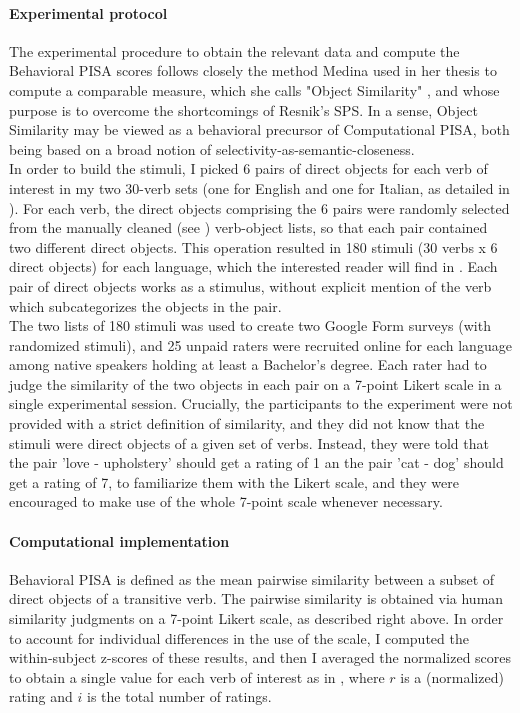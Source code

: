 \paragraph{Experimental protocol}
The experimental procedure to obtain the relevant data and compute the Behavioral PISA scores follows closely the method Medina used in her thesis to compute a comparable measure, which she calls "Object Similarity" \parencite[173-178]{Medina2007}, and whose purpose is to overcome the shortcomings of Resnik's SPS. In a sense, Object Similarity may be viewed as a behavioral precursor of Computational PISA, both being based on a broad notion of selectivity-as-semantic-closeness.\\
In order to build the stimuli, I picked 6 pairs of direct objects for each verb of interest in my two 30-verb sets (one for English and one for Italian, as detailed in ). For each verb, the direct objects comprising the 6 pairs were randomly selected from the manually cleaned (see ) verb-object lists, so that each pair contained two different direct objects. This operation resulted in 180 stimuli (30 verbs x 6 direct objects) for each language, which the interested reader will find in . Each pair of direct objects works as a stimulus, without explicit mention of the verb which subcategorizes the objects in the pair.\\
The two lists of 180 stimuli was used to create two Google Form surveys (with randomized stimuli), and 25 unpaid raters were recruited online for each language among native speakers holding at least a Bachelor's degree. Each rater had to judge the similarity of the two objects in each pair on a 7-point Likert scale in a single experimental session. Crucially, the participants to the experiment were not provided with a strict definition of similarity, and they did not know that the stimuli were direct objects of a given set of verbs. Instead, they were told that the pair 'love - upholstery' should get a rating of 1 an the pair 'cat - dog' should get a rating of 7, to familiarize them with the Likert scale, and they were encouraged to make use of the whole 7-point scale whenever necessary.

\paragraph{Computational implementation} Behavioral PISA is defined as the mean pairwise similarity between a subset of direct objects of a transitive verb. The pairwise similarity is obtained via human similarity judgments on a 7-point Likert scale, as described right above. In order to account for individual differences in the use of the scale, I computed the within-subject z-scores of these results, and then I averaged the normalized scores to obtain a single value for each verb of interest \parencite{KimEtAl2018, KimEtAl2019, KimEtAl2019a} as in , where $r$ is a (normalized) rating and $i$ is the total number of ratings.

